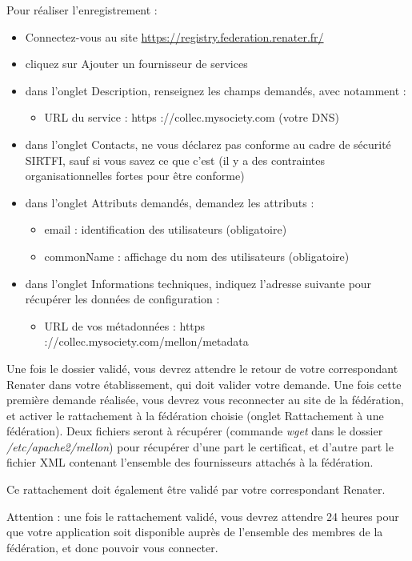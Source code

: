 Pour réaliser l’enregistrement :
\begin{itemize}
	\item Connectez-vous au site \href{https://registry.federation.renater.fr/}{https://registry.federation.renater.fr/}
	\item cliquez sur Ajouter un fournisseur de services
	\item dans l’onglet Description, renseignez les champs demandés, avec notamment :
	\begin{itemize}
		\item URL du service : https ://collec.mysociety.com (votre DNS)
	\end{itemize}
	\item dans l’onglet Contacts, ne vous déclarez pas conforme au cadre de sécurité SIRTFI, sauf si vous savez ce que c’est (il y a des contraintes organisationnelles fortes pour être conforme)
	\item dans l’onglet Attributs demandés, demandez les attributs :
	\begin{itemize}
		\item email : identification des utilisateurs (obligatoire)
		\item commonName : affichage du nom des utilisateurs (obligatoire)
	\end{itemize}
	\item dans l’onglet Informations techniques, indiquez l’adresse suivante pour récupérer les données de configuration :
	\begin{itemize}
		\item URL de vos métadonnées : https ://collec.mysociety.com/mellon/metadata
	\end{itemize}
\end{itemize}

Une fois le dossier validé, vous devrez attendre le retour de votre correspondant Renater dans votre établissement, qui doit valider votre demande.
Une fois cette première demande réalisée, vous devrez vous reconnecter au site de la fédération, et activer le rattachement à la fédération choisie (onglet Rattachement à une fédération). Deux fichiers seront à récupérer (commande \textit{wget} dans le dossier \textit{/etc/apache2/mellon}) pour récupérer d’une part le certificat, et d’autre part le fichier XML contenant l’ensemble des fournisseurs attachés à la fédération.

Ce rattachement doit également être validé par votre correspondant Renater.

Attention : une fois le rattachement validé, vous devrez attendre 24 heures pour que votre application soit disponible auprès de l’ensemble des membres de la fédération, et donc pouvoir vous connecter.

